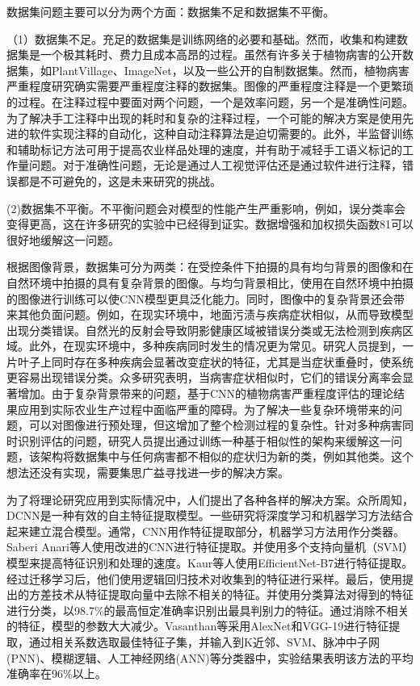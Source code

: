 数据集问题主要可以分为两个方面：数据集不足和数据集不平衡。

（1）数据集不足。充足的数据集是训练网络的必要和基础。然而，收集和构建数据集是一个极其耗时、费力且成本高昂的过程。虽然有许多关于植物病害的公开数据集，如PlantVillage、ImageNet，以及一些公开的自制数据集。然而，植物病害严重程度研究确实需要严重程度注释的数据集。图像的严重程度注释是一个更繁琐的过程。在注释过程中要面对两个问题，一个是效率问题，另一个是准确性问题。为了解决手工注释中出现的耗时和复杂的注释过程，一个可能的解决方案是使用先进的软件实现注释的自动化，这种自动注释算法是迫切需要的。此外，半监督训练和辅助标记方法可用于提高农业样品处理的速度，并有助于减轻手工语义标记的工作量问题。对于准确性问题，无论是通过人工视觉评估还是通过软件进行注释，错误都是不可避免的，这是未来研究的挑战。

(2)数据集不平衡。不平衡问题会对模型的性能产生严重影响，例如，误分类率会变得更高，这在许多研究的实验中已经得到证实。数据增强和加权损失函数81可以很好地缓解这一问题。

根据图像背景，数据集可分为两类：在受控条件下拍摄的具有均匀背景的图像和在自然环境中拍摄的具有复杂背景的图像。与均匀背景相比，使用在自然环境中拍摄的图像进行训练可以使CNN模型更具泛化能力。同时，图像中的复杂背景还会带来其他负面问题。例如，在现实环境中，地面污渍与疾病症状相似，从而导致模型出现分类错误。自然光的反射会导致阴影健康区域被错误分类或无法检测到疾病区域。此外，在现实环境中，多种疾病同时发生的情况更为常见。研究人员提到，一片叶子上同时存在多种疾病会显著改变症状的特征，尤其是当症状重叠时，使系统更容易出现错误分类。众多研究表明，当病害症状相似时，它们的错误分离率会显著增加。由于复杂背景带来的问题，基于CNN的植物病害严重程度评估的理论结果应用到实际农业生产过程中面临严重的障碍。为了解决一些复杂环境带来的问题，可以对图像进行预处理，但这增加了整个检测过程的复杂性。针对多种病害同时识别评估的问题，研究人员提出通过训练一种基于相似性的架构来缓解这一问题，该架构将数据集中与任何病害都不相似的症状归为新的类，例如其他类。这个想法还没有实现，需要集思广益寻找进一步的解决方案。

为了将理论研究应用到实际情况中，人们提出了各种各样的解决方案。众所周知，DCNN是一种有效的自主特征提取模型。一些研究将深度学习和机器学习方法结合起来建立混合模型。通常，CNN用作特征提取部分，机器学习方法用作分类器。Saberi Anari等人使用改进的CNN进行特征提取。并使用多个支持向量机（SVM）模型来提高特征识别和处理的速度。Kaur等人使用EfficientNet-B7进行特征提取。经过迁移学习后，他们使用逻辑回归技术对收集到的特征进行采样。最后，使用提出的方差技术从特征提取向量中去除不相关的特征。并使用分类算法对得到的特征进行分类，以98.7\%的最高恒定准确率识别出最具判别力的特征。通过消除不相关的特征，模型的参数大大减少。Vasanthan等采用AlexNet和VGG-19进行特征提取，通过相关系数选取最佳特征子集，并输入到K近邻、SVM、脉冲中子网(PNN)、模糊逻辑、人工神经网络(ANN)等分类器中，实验结果表明该方法的平均准确率在96\%以上。

